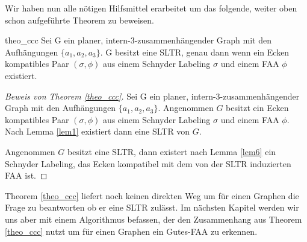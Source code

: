 Wir haben nun alle nötigen Hilfsmittel erarbeitet um das folgende, weiter oben schon aufgeführte Theorem zu beweisen.

\begin{reptheorem}{theo_ccc}
Sei G ein planer, intern-3-zusammenhängender Graph mit den Aufhängungen $\{a_1,a_2,a_3\}$. G besitzt eine SLTR, genau dann wenn ein Ecken kompatibles Paar $(\sigma,\phi)$ aus einem Schnyder Labeling $\sigma$ und einem FAA $\phi$ existiert.
\end{reptheorem}

\begin{proof}[Beweis von Theorem \ref{theo_ccc}]
Sei G ein planer, intern-3-zusammenhängender Graph mit den Aufhängungen $\{a_1,a_2,a_3\}$. Angenommen $G$ besitzt ein Ecken kompatibles Paar $(\sigma,\phi)$ aus einem Schnyder Labeling $\sigma$ und einem FAA $\phi$. Nach Lemma \ref{lem1} existiert dann eine SLTR von $G$. 

Angenommen $G$ besitzt eine SLTR, dann existert nach Lemma \ref{lem6} ein Schnyder Labeling, das Ecken kompatibel mit dem von der SLTR induzierten FAA ist.
\end{proof}

Theorem \ref{theo_ccc} liefert noch keinen direkten Weg um für einen Graphen die Frage zu beantworten ob er eine SLTR zulässt. Im nächsten Kapitel werden wir uns aber mit einem Algorithmus befassen, der den Zusammenhang aus Theorem \ref{theo_ccc} nutzt um für einen Graphen ein Gutes-FAA zu erkennen.





